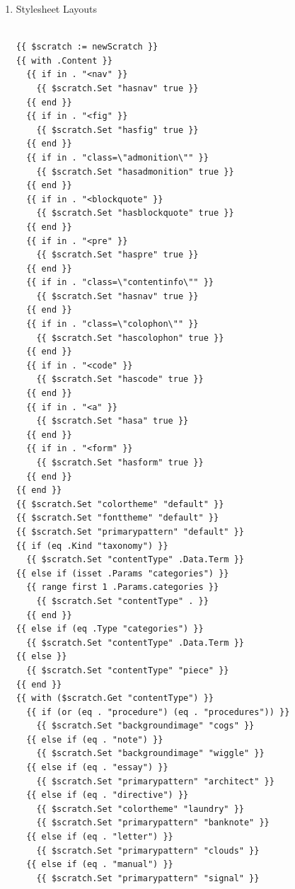 \documentclass[11pt]{article}
\begin{document}
\begin{enumerate}
\begin{enumerate}
\begin{verbatim}
{{ if (.IsPage) }}
{{ $scratch := newScratch }}
{{ if (isset .Params "categories") }}
  {{ with .Params.categories }}
    {{ range first 1 . }}
      {{ $scratch.Set "contentType" . }}
    {{ end }}
  {{ else }}
    {{ $scratch.Set "contentType" "piece" }}
  {{ end }}
{{ end }}
  <li>
    <a href="{{ .Permalink }}">
      {{ .Title }}
    </a>:
    {{ partial "description.html" . }}
  </li>
{{ end }}
\end{verbatim}
\end{enumerate}
\item Stylesheet Layouts
\label{sec:org998f374}
\begin{verbatim}

{{ $scratch := newScratch }}
{{ with .Content }}
  {{ if in . "<nav" }}
    {{ $scratch.Set "hasnav" true }}
  {{ end }}
  {{ if in . "<fig" }}
    {{ $scratch.Set "hasfig" true }}
  {{ end }}
  {{ if in . "class=\"admonition\"" }}
    {{ $scratch.Set "hasadmonition" true }}
  {{ end }}
  {{ if in . "<blockquote" }}
    {{ $scratch.Set "hasblockquote" true }}
  {{ end }}
  {{ if in . "<pre" }}
    {{ $scratch.Set "haspre" true }}
  {{ end }}
  {{ if in . "class=\"contentinfo\"" }}
    {{ $scratch.Set "hasnav" true }}
  {{ end }}
  {{ if in . "class=\"colophon\"" }}
    {{ $scratch.Set "hascolophon" true }}
  {{ end }}
  {{ if in . "<code" }}
    {{ $scratch.Set "hascode" true }}
  {{ end }}
  {{ if in . "<a" }}
    {{ $scratch.Set "hasa" true }}
  {{ end }}
  {{ if in . "<form" }}
    {{ $scratch.Set "hasform" true }}
  {{ end }}
{{ end }}
{{ $scratch.Set "colortheme" "default" }}
{{ $scratch.Set "fonttheme" "default" }}
{{ $scratch.Set "primarypattern" "default" }}
{{ if (eq .Kind "taxonomy") }}
  {{ $scratch.Set "contentType" .Data.Term }}
{{ else if (isset .Params "categories") }}
  {{ range first 1 .Params.categories }}
    {{ $scratch.Set "contentType" . }}
  {{ end }}
{{ else if (eq .Type "categories") }}
  {{ $scratch.Set "contentType" .Data.Term }}
{{ else }}
  {{ $scratch.Set "contentType" "piece" }}
{{ end }}
{{ with ($scratch.Get "contentType") }}
  {{ if (or (eq . "procedure") (eq . "procedures")) }}
    {{ $scratch.Set "backgroundimage" "cogs" }}
  {{ else if (eq . "note") }}
    {{ $scratch.Set "backgroundimage" "wiggle" }}
  {{ else if (eq . "essay") }}
    {{ $scratch.Set "primarypattern" "architect" }}
  {{ else if (eq . "directive") }}
    {{ $scratch.Set "colortheme" "laundry" }}
    {{ $scratch.Set "primarypattern" "banknote" }}
  {{ else if (eq . "letter") }}
    {{ $scratch.Set "primarypattern" "clouds" }}
  {{ else if (eq . "manual") }}
    {{ $scratch.Set "primarypattern" "signal" }}

\end{verbatim}
\end{enumerate}
\end{document}
